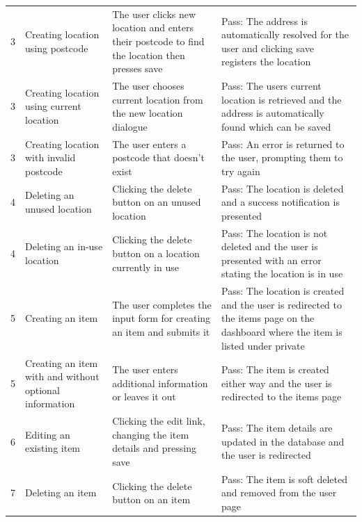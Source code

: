 \begin{longtable}{@{}p{}p{}p{}p{}@{}}
	3 & Creating location using postcode & The user clicks new location and enters their postcode to find the location then presses save & \textcolor{PassGreen}{Pass}: The address is automatically resolved for the user and clicking save registers the location \\
	
	3 & Creating location using current location & The user chooses current location from the new location dialogue & \textcolor{PassGreen}{Pass}: The users current location is retrieved and the address is automatically found which can be saved \\
	
	3 & Creating location with invalid postcode & The user enters a postcode that doesn't exist & \textcolor{PassGreen}{Pass}:  An error is returned to the user, prompting them to try again \\
	
	
	4 & Deleting an unused location & Clicking the delete button on an unused location & \textcolor{PassGreen}{Pass}: The location is deleted and a success notification is presented \\
	
	4 & Deleting an in-use location & Clicking the delete button on a location currently in use & \textcolor{PassGreen}{Pass}: The location is not deleted and the user is presented with an error stating the location is in use \\
	
	5 & Creating an item & The user completes the input form for creating an item and submits it & \textcolor{PassGreen}{Pass}: The location is created and the user is redirected to the items page on the dashboard where the item is listed under private\\
	
	5 & Creating an item with and without optional information & The user enters additional information or leaves it out & \textcolor{PassGreen}{Pass}: The item is created either way and the user is redirected to the items page \\
	
	6 & Editing an existing item & Clicking the edit link, changing the item details and pressing save & \textcolor{PassGreen}{Pass}: The item details are updated in the database and the user is redirected \\
	
	7 & Deleting an item & Clicking the delete button on an item & \textcolor{PassGreen}{Pass}: The item is soft deleted and removed from the user page \\
	

\end{longtable}
